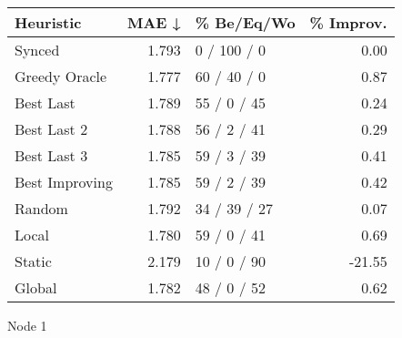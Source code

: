 \begin{tabular}{lrlr}
\toprule
\textbf{Heuristic} & \textbf{MAE ↓} & \textbf{\% Be/Eq/Wo} & \textbf{\% Improv.} \\
\midrule
            Synced &          1.793 &          0 / 100 / 0 &                0.00 \\
     Greedy Oracle &          1.777 &          60 / 40 / 0 &                0.87 \\
         Best Last &          1.789 &          55 / 0 / 45 &                0.24 \\
       Best Last 2 &          1.788 &          56 / 2 / 41 &                0.29 \\
       Best Last 3 &          1.785 &          59 / 3 / 39 &                0.41 \\
    Best Improving &          1.785 &          59 / 2 / 39 &                0.42 \\
            Random &          1.792 &         34 / 39 / 27 &                0.07 \\
             Local &          1.780 &          59 / 0 / 41 &                0.69 \\
            Static &          2.179 &          10 / 0 / 90 &              -21.55 \\
            Global &          1.782 &          48 / 0 / 52 &                0.62 \\
\bottomrule
\end{tabular}
\caption{Node 1}
\label{tab:ds_iid_lr01_le1_bs4_1}
